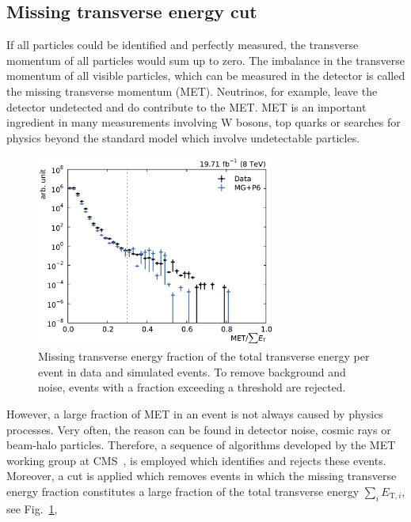 \subsection{Missing transverse energy cut}

If all particles could be identified and perfectly measured, the transverse
momentum of all particles would sum up to zero. The imbalance in the transverse
momentum of all visible particles, which can be measured in the detector is
called the missing transverse momentum (MET). Neutrinos, for example, leave the
detector undetected and do contribute to the MET. MET is an important ingredient
in many measurements involving W bosons, top quarks or searches for physics
beyond the standard model which involve undetectable particles. 

\begin{figure}[htbp]
    \centering
    \includegraphics[width=0.7\textwidth]{figures/measurement/metoversumet.pdf}
    \caption[Missing transverse energy distribution]{Missing transverse energy
    fraction of the total transverse energy per event in data and simulated
    events. To remove background and noise, events with a fraction exceeding a
    threshold are rejected. }
    \label{fig:mc:met_fraction}
\end{figure}

However, a large fraction of MET in an event is not always caused by physics
processes. Very often, the reason can be found in detector noise, cosmic rays or
beam-halo particles. Therefore, a sequence of algorithms developed by the MET
working group at CMS~\cite{jetmet:metfilters}, is employed which identifies and
rejects these events.  Moreover, a cut is applied which removes events in which
the missing transverse energy fraction \met constitutes a large fraction of the
total transverse energy $\sum_i E_{\mathrm{T},i}$, see
Fig.~\ref{fig:mc:met_fraction},

